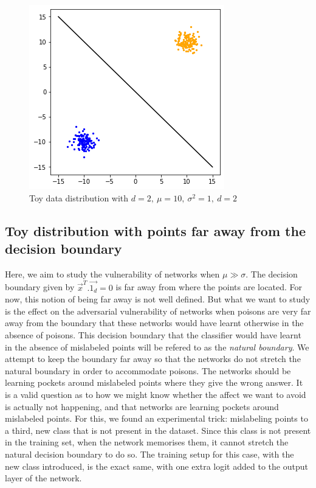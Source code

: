 \documentclass{ociamthesis}
\begin{document}
\begin{figure}[!h]
    \centering
    \includegraphics[scale=0.4]{sample_data}
    \caption{Toy data distribution with $d=2,~\mu=10,~\sigma^2=1,~d=2$}
    \label{fig:data_sample}
\end{figure}



\subsection{Toy distribution with points far away from the decision boundary}

Here, we aim to study the vulnerability of networks when $\mu \gg \sigma$. The
decision boundary given by $\vec{x}^T.\vec{1_d} = 0$ is far away from where the
points are located. For now, this notion of being far away is not well defined.
But what we want to study is the effect on the adversarial vulnerability of
networks when poisons are very far away from the boundary that these networks
would have learnt otherwise in the absence of poisons. This decision boundary
that the classifier would have learnt in the absence of mislabeled points will
be refered to as the \emph{natural boundary}. We attempt to keep the boundary
far away so that the networks do not stretch the natural boundary in order to
accommodate poisons. The networks should be learning pockets around mislabeled
points where they give the wrong answer. It is a valid question as to how we
might know whether the affect we want to avoid is actually not happening, and
that networks are learning pockets around mislabeled points. For this, we found
an experimental trick: mislabeling points to a third, new class that is not
present in the dataset. Since this class is not present in the training set,
when the network memorises them, it cannot stretch the natural decision boundary
to do so. The training setup for this case, with the new class introduced, is
the exact same, with one extra logit added to the output layer of the network.
\end{document}
